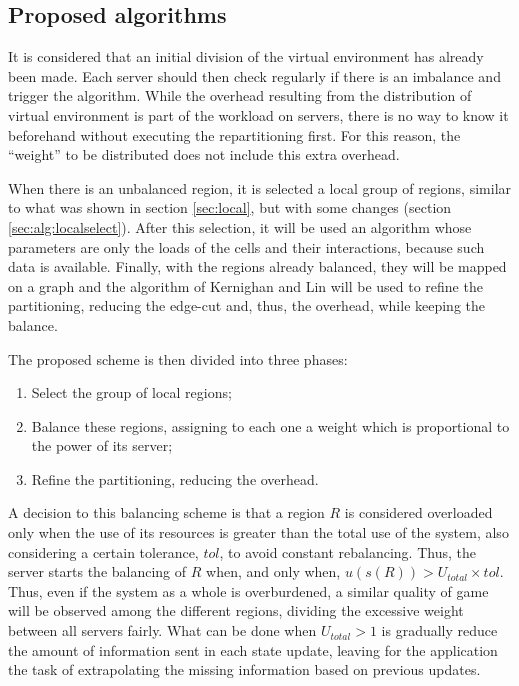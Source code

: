 \subsection{Proposed algorithms}
\label{sec:alg}
	
It is considered that an initial division of the virtual environment has already been made. Each server should then check regularly if there is an imbalance and trigger the algorithm. While the overhead resulting from the distribution of virtual environment is part of the workload on servers, there is no way to know it beforehand without executing the repartitioning first. For this reason, the ``weight'' to be distributed does not include this extra overhead.

When there is an unbalanced region, it is selected a local group of regions, similar to what was shown in section \ref{sec:local}, but with some changes (section \ref{sec:alg:localselect}). After this selection, it will be used an algorithm whose parameters are only the loads of the cells and their interactions, because such data is available. Finally, with the regions already balanced, they will be mapped on a graph and the algorithm of Kernighan and Lin \cite{kernighan1970ehp} will be used to refine the partitioning, reducing the edge-cut and, thus, the overhead, while keeping the balance.

The proposed scheme is then divided into three phases:

\begin{enumerate}
	\item Select the group of local regions;
	\item Balance these regions, assigning to each one a weight which is proportional to the power of its server;
	\item Refine the partitioning, reducing the overhead.
\end{enumerate}

A decision to this balancing scheme is that a region $R$ is considered overloaded only when the use of its resources is greater than the total use of the system, also considering a certain tolerance, $tol$, to avoid constant rebalancing. Thus, the server starts the balancing of $R$ when, and only when, $u(s(R)) > U_{total} \times tol$. Thus, even if the system as a whole is overburdened, a similar quality of game will be observed among the different regions, dividing the excessive weight between all servers fairly. What can be done when $U_{total} > 1$ is gradually reduce the amount of information sent in each state update, leaving for the application the task of extrapolating the missing information based on previous updates.

